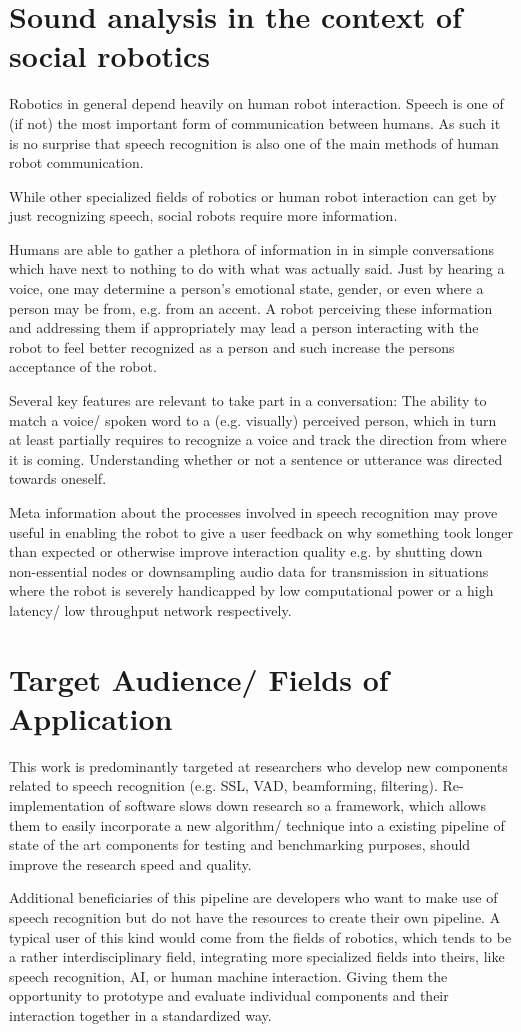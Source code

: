 \section{Sound analysis in the context of social robotics}
Robotics in general depend heavily on human robot interaction. Speech is one of (if not) the most important form of communication between humans. 
As such it is no surprise that speech recognition is also one of the main methods of human robot communication.

While other specialized fields of robotics or human robot interaction can get by just recognizing speech, social robots require more information.

Humans are able to gather a plethora of information in in simple conversations which have next to nothing to do with what was actually said. 
Just by hearing a voice, one may determine a person’s emotional state, gender, or even where a person may be from, e.g. from an accent. 
A robot perceiving these information and addressing them if appropriately may lead a person interacting with the robot to feel better recognized as a person and such increase the persons acceptance of the robot.

Several key features are relevant to take part in a conversation: 
The ability to match a voice/ spoken word to a (e.g. visually) perceived person, which in turn at least partially requires to recognize a voice and track the direction from where it is coming. 
Understanding whether or not a sentence or utterance was directed towards oneself.

Meta information about the processes involved in speech recognition may prove useful in enabling the robot to give a user feedback on why something took longer than expected or otherwise improve interaction quality e.g. by shutting down non-essential nodes or downsampling audio data for transmission in situations where the robot is severely handicapped by low computational power or a high latency/ low throughput network respectively.

\section{Target Audience/ Fields of Application}

This work is predominantly targeted at researchers who develop new components related to speech recognition (e.g. SSL, VAD, beamforming, filtering). 
Re-implementation of software slows down research so a framework, which allows them to easily incorporate a new algorithm/ technique into a existing pipeline of state of the art components for testing and benchmarking purposes, should improve the research speed and quality.

Additional beneficiaries of this pipeline are developers who want to make use of speech recognition but do not have the resources to create their own pipeline.
A typical user of this kind would come from the fields of robotics, which tends to be a rather interdisciplinary field, integrating more specialized fields into theirs, like speech recognition, AI, or human machine interaction.
Giving them the opportunity to prototype and evaluate individual components and their interaction together in a standardized way.